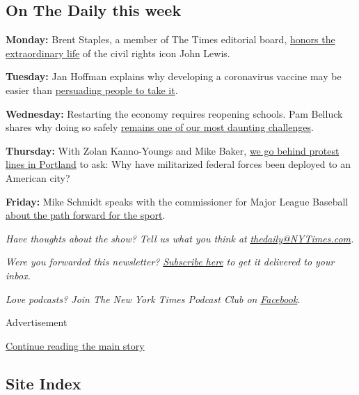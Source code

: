 \hypertarget{on-the-daily-this-week}{%
\subsection{On The Daily this week}\label{on-the-daily-this-week}}

\textbf{Monday:} Brent Staples, a member of The Times editorial board,
\href{https://www.nytimes3xbfgragh.onion/2020/07/20/podcasts/the-daily/john-lewis.html}{honors
the extraordinary life} of the civil rights icon John Lewis.

\textbf{Tuesday:} Jan Hoffman explains why developing a coronavirus
vaccine may be easier than
\href{https://www.nytimes3xbfgragh.onion/2020/07/21/podcasts/the-daily/coronavirus-vaccine.html}{persuading
people to take it}.

\textbf{Wednesday:} Restarting the economy requires reopening schools.
Pam Belluck shares why doing so safely
\href{https://www.nytimes3xbfgragh.onion/2020/07/22/podcasts/the-daily/school-reopenings-coronavirus.html}{remains
one of our most daunting challenges}.

\textbf{Thursday:} With Zolan Kanno-Youngs and Mike Baker,
\href{https://www.nytimes3xbfgragh.onion/2020/07/23/podcasts/the-daily/portland-protests.html}{we
go behind protest lines in Portland} to ask: Why have militarized
federal forces been deployed to an American city?

\textbf{Friday:} Mike Schmidt speaks with the commissioner for Major
League Baseball
\href{https://www.nytimes3xbfgragh.onion/2020/07/24/podcasts/the-daily/mlb-baseball-season-coronavirus.html?action=click\&module=Briefings\&pgtype=Homepage}{about
the path forward for the sport}.

\emph{Have thoughts about the show? Tell us what you think at}
\href{mailto:thedaily@NYTimes.com?subject=The\%20Daily\%20newsletter}{\emph{thedaily@NYTimes.com}}\emph{.}

\emph{Were you forwarded this newsletter?}
\href{https://www.nytimes3xbfgragh.onion/newsletters/the-daily?te=1\&nl=the-daily\&emc=edit_dy_20190627}{\emph{Subscribe
here}} \emph{to get it delivered to your inbox.}

\emph{Love podcasts? Join The New York Times Podcast Club on}
\href{https://www.facebookcorewwwi.onion/groups/nytpodcastclub}{\emph{Facebook}}\emph{.}

Advertisement

\protect\hyperlink{after-bottom}{Continue reading the main story}

\hypertarget{site-index}{%
\subsection{Site Index}\label{site-index}}

